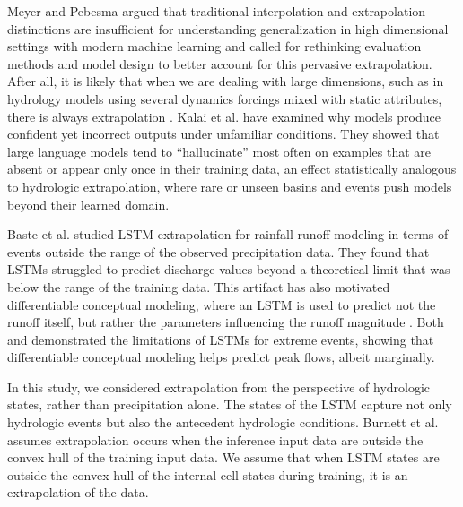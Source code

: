\documentclass{article}
\begin{document}
Meyer and Pebesma \cite{Meyer2021} argued that traditional interpolation and extrapolation distinctions are insufficient for understanding generalization in high dimensional settings with modern machine learning and called for rethinking evaluation methods and model design to better account for this pervasive extrapolation. After all, it is likely that when we are dealing with large dimensions, such as in hydrology models using several dynamics forcings mixed with static attributes, there is always extrapolation \cite{balestriero2021learning}. Kalai et al. \cite{kalai2025why} have examined why models produce confident yet incorrect outputs under unfamiliar conditions. They showed that large language models tend to “hallucinate” most often on examples that are absent or appear only once in their training data, an effect statistically analogous to hydrologic extrapolation, where rare or unseen basins and events push models beyond their learned domain.

Baste et al. \cite{baste2025unveiling} studied LSTM extrapolation for rainfall-runoff modeling in terms of events outside the range of the observed precipitation data. They found that LSTMs struggled to predict discharge values beyond a theoretical limit that was below the range of the training data. This artifact has also motivated differentiable conceptual modeling, where an LSTM is used to predict not the runoff itself, but rather the parameters influencing the runoff magnitude \cite{song2025physicsinformed}.  Both \cite{song2025physicsinformed} and \cite{acuna2024analyzing} demonstrated the limitations of LSTMs for extreme events, showing that differentiable conceptual modeling helps predict peak flows, albeit marginally.

In this study, we considered extrapolation from the perspective of hydrologic states, rather than precipitation alone. The states of the LSTM capture not only hydrologic events but also the antecedent hydrologic conditions. Burnett et al. \cite{Burnett2025} assumes extrapolation occurs when the inference input data are outside the convex hull of the training input data. We assume that when LSTM states are outside the convex hull of the internal cell states during training, it is an extrapolation of the data. 
\end{document}
